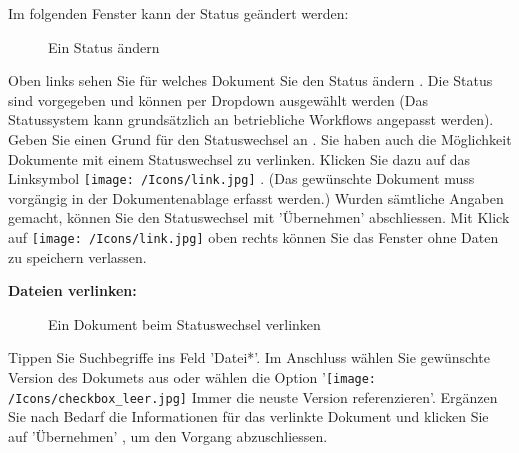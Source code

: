 Im folgenden Fenster kann der Status geändert werden:

\begin{figure}[H]
\caption{Ein Status ändern}
\end{figure}

Oben links sehen Sie für welches Dokument Sie den Status ändern . Die Status sind vorgegeben und können per Dropdown ausgewählt werden  (Das Statussystem kann grundsätzlich an betriebliche Workflows angepasst werden). Geben Sie einen Grund für den Statuswechsel an . Sie haben auch die Möglichkeit Dokumente mit einem Statuswechsel zu verlinken. Klicken Sie dazu auf das Linksymbol \texttt{[image: /Icons/link.jpg]} . (Das gewünschte Dokument muss vorgängig in der Dokumentenablage erfasst werden.) Wurden sämtliche Angaben gemacht, können Sie den Statuswechsel mit 'Übernehmen'  abschliessen. Mit Klick auf \texttt{[image: /Icons/link.jpg]}  oben rechts können Sie das Fenster ohne Daten zu speichern verlassen.

\vspace{\baselineskip}

\textbf{Dateien verlinken:}

\begin{figure}[H]
\caption{Ein Dokument beim Statuswechsel verlinken}
\end{figure}

Tippen Sie Suchbegriffe ins Feld 'Datei*'. Im Anschluss wählen Sie gewünschte Version des Dokumets aus oder wählen die Option '\texttt{[image: /Icons/checkbox\_leer.jpg]} Immer die neuste Version referenzieren'. Ergänzen Sie nach Bedarf die Informationen für das verlinkte Dokument und klicken Sie auf 'Übernehmen' , um den Vorgang abzuschliessen.


